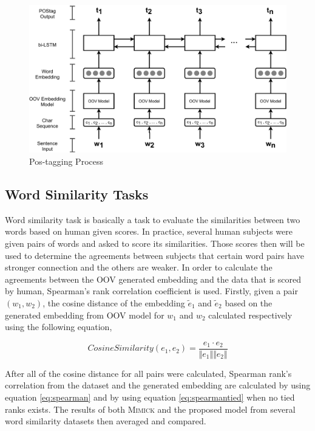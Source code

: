         \begin{figure}
            \centering
            \includegraphics[width=.8\linewidth]{images/postag.pdf}
            \caption{Pos-tagging Process}
            \label{fig:postag}
        \end{figure}
 
    \subsection{Word Similarity Tasks}
        Word similarity task is basically a task to evaluate the
        similarities between two words based on human given scores. In
        practice, several human subjects were given pairs of words and
        asked to score its similarities. Those scores then will be
        used to determine the agreements between subjects that certain
        word pairs have stronger connection and the others are weaker.
        In order to calculate the agreements between the OOV generated
        embedding and the data that is scored by human, Spearman's
        rank correlation coefficient is used. Firstly, given a pair
        $(w_1, w_2)$, the cosine distance of the embedding
        $\tilde{e}_1$ and $\tilde{e}_2$ based on the generated
        embedding from OOV model for $w_1$ and $w_2$ calculated
        respectively using the following equation,

        \begin{equation}
            \label{eq:cosinesim}
            CosineSimilarity(e_1, e_2) = \frac{e_1 \cdot e_2}{\Vert e_1 \Vert \Vert e_2 \Vert}
        \end{equation}

        After all of the cosine distance for all pairs were calculated,
        Spearman rank's correlation from the dataset and the generated
        embedding are calculated by using equation \ref{eq:spearman}
        and by using equation \ref{eq:spearmantied} when no tied ranks
        exists. The results of both \textsc{Mimick} and the proposed
        model from several word similarity datasets then averaged and
        compared.
        
